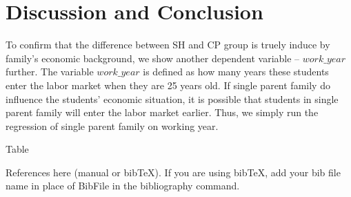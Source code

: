 \documentclass[]{AEA}
\begin{document}
\section{Discussion and Conclusion}

    To confirm that the difference between SH and CP group is truely induce by family's economic background, we show another dependent variable -- $work\_year$ further. The variable $work\_year$ is defined as how many years these students enter the labor market when they are 25 years old. If single parent family do influence the students' economic situation, it is possible that students in single parent family will enter the labor market earlier. Thus, we simply run the regression of single parent family on working year.

    Table 




References here (manual or bibTeX). If you are using bibTeX, add your bib file 
name in place of BibFile in the bibliography command.



\appendix
\end{document}
